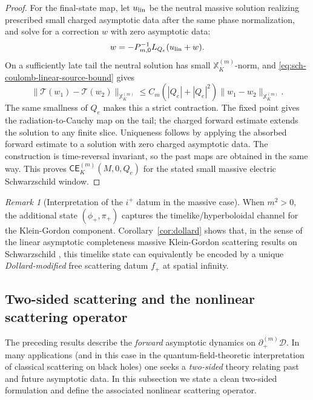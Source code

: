 \documentclass[11pt]{article}
\numberwithin{equation}{section}
\theoremstyle{plain}
\theoremstyle{definition}
\theoremstyle{remark}
\newtheorem{remark}{Remark}[section]
\newcommand{\D}{\mathcal{D}}
\newcommand{\CElec}{\mathsf{CE}}
\begin{document}
\begin{proof}
For the final-state map, let \(u_{\rm lin}\) be the neutral massive solution realizing prescribed small charged asymptotic data after the same phase normalization, and solve for a correction \(w\) with zero asymptotic data:
\begin{equation}
 w=-P_{m,0}^{-1}L_{Q_e}(u_{\rm lin}+w).
\end{equation}
On a sufficiently late tail the neutral solution has small \(\mathbb X_K^{(m)}\)-norm, and \eqref{eq:sch-coulomb-linear-source-bound} gives
\begin{equation}
 \|\mathcal T(w_1)-\mathcal T(w_2)\|_{\mathbb X_K^{(m)}}
 \le C_m(|Q_e|+|Q_e|^2)
       \|w_1-w_2\|_{\mathbb X_K^{(m)}}.
\end{equation}
The same smallness of \(Q_e\) makes this a strict contraction.  The fixed point gives the radiation-to-Cauchy map on the tail; the charged forward estimate extends the solution to any finite slice.  Uniqueness follows by applying the absorbed forward estimate to a solution with zero charged asymptotic data.  The construction is time-reversal invariant, so the past maps are obtained in the same way.  This proves \(\CElec_K^{(m)}(M,0,Q_e)\) for the stated small massive electric Schwarzschild window.
\end{proof}

\begin{remark}[Interpretation of the $i^+$ datum in the massive case]\label{rem:dollard-interpretation}
When $m^{2}>0$, the additional state $(\phi_{+},\pi_{+})$ captures the timelike/hyperboloidal channel for the Klein-Gordon component.
Corollary~\ref{cor:dollard} shows that, in the sense of the linear asymptotic completeness massive Klein-Gordon scattering results on Schwarzschild \cite{BachelotKG}, this timelike state can equivalently be encoded by a unique \emph{Dollard-modified} free scattering datum $f_{+}$ at spatial infinity.
\end{remark}

\subsection{Two-sided scattering and the nonlinear scattering operator}
\label{subsec:two-sided-scattering}

The preceding results describe the \emph{forward} asymptotic dynamics on $\partial_{+}^{(m)}\D$.
In many applications (and in this case in the quantum-field-theoretic interpretation of classical scattering on black holes) one seeks a \emph{two-sided} theory relating past and future asymptotic data.
In this subsection we state a clean two-sided formulation and define the associated nonlinear scattering operator.
\end{document}

